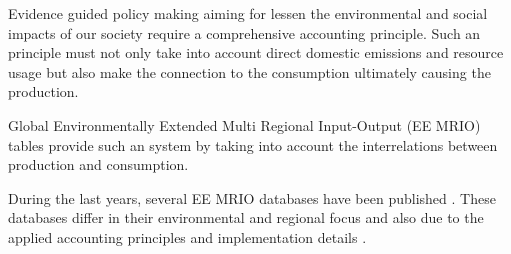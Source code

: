 Evidence guided policy making aiming for lessen the environmental and social
impacts of our society require a comprehensive accounting principle. Such an principle must not only take into account direct domestic emissions and resource usage but also make the connection to the consumption ultimately causing the production.

Global Environmentally Extended Multi Regional Input-Output (EE MRIO) tables provide such an system by taking into account the interrelations between production and consumption. 

During the last years, several EE MRIO databases have been published \cite{Tukker_2013}. These databases differ in their environmental and regional focus and also due to the applied accounting principles and implementation details \cite{Stadler_2014, Owen_2014, Moran_2014}. 
